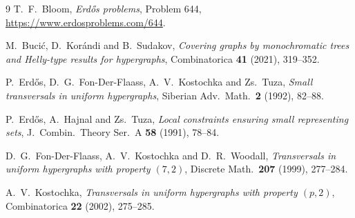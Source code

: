 \documentclass[11pt]{article}
\numberwithin{equation}{section}
\theoremstyle{definition}
\theoremstyle{remark}
\begin{document}
\begin{thebibliography}{9}
T.~F.~Bloom, \emph{Erd\H{o}s problems}, Problem 644,
\url{https://www.erdosproblems.com/644}.

M.~Buci\'c, D.~Kor\'andi and B.~Sudakov,
\emph{Covering graphs by monochromatic trees and Helly-type results for
hypergraphs}, Combinatorica \textbf{41} (2021), 319--352.

P.~Erd\H{o}s, D.~G.~Fon-Der-Flaass, A.~V.~Kostochka and Zs.~Tuza,
\emph{Small transversals in uniform hypergraphs},
Siberian Adv.\ Math.\ \textbf{2} (1992), 82--88.

P.~Erd\H{o}s, A.~Hajnal and Zs.~Tuza,
\emph{Local constraints ensuring small representing sets},
J.\ Combin.\ Theory Ser.\ A \textbf{58} (1991), 78--84.

D.~G.~Fon-Der-Flaass, A.~V.~Kostochka and D.~R.~Woodall,
\emph{Transversals in uniform hypergraphs with property $(7,2)$},
Discrete Math.\ \textbf{207} (1999), 277--284.

A.~V.~Kostochka,
\emph{Transversals in uniform hypergraphs with property $(p,2)$},
Combinatorica \textbf{22} (2002), 275--285.
\end{thebibliography}
\end{document}
